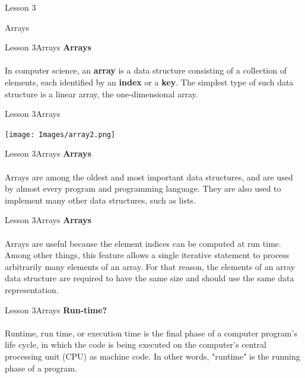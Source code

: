 \documentclass[aspectratio=1610]{beamer}
\begin{document}
\begin{frame}{Lesson 3}{}
\begin{center}
\Huge Arrays
\end{center}
\end{frame}

\begin{frame}{Lesson 3}{Arrays}
\LARGE
\textbf{Arrays}\\~\\
In computer science, an \textbf{array} is a data structure consisting of a collection of elements, each identified by an \textbf{index} or a \textbf{key}. The simplest type of such data structure is a linear array, the one-dimensional array.
\end{frame}


\begin{frame}{Lesson 3}{Arrays}
\begin{center}
\texttt{[image: Images/array2.png]}
\end{center}
\end{frame}



\begin{frame}{Lesson 3}{Arrays}
\LARGE
\textbf{Arrays}\\~\\
Arrays are among the oldest and most important data structures, and are used by almost every program and programming language. They are also used to implement many other data structures, such as lists.
\end{frame}


\begin{frame}{Lesson 3}{Arrays}
\LARGE
\textbf{Arrays}\\~\\
Arrays are useful because the element indices can be computed at \alert{run time}. Among
other things, this feature allows a single iterative statement to process arbitrarily many
elements of an array. For that reason, the elements of an array data structure are required
to have the same size and should use the same data representation. 
\end{frame}



\begin{frame}{Lesson 3}{Arrays}
\LARGE
\textbf{Run-time?}\\~\\
Runtime, run time, or execution time is the final phase of a computer program's life cycle,
in which the code is being executed on the computer's central processing unit (CPU) as
machine code. In other words, "runtime" is the running phase of a program.
\end{frame}
\end{document}
